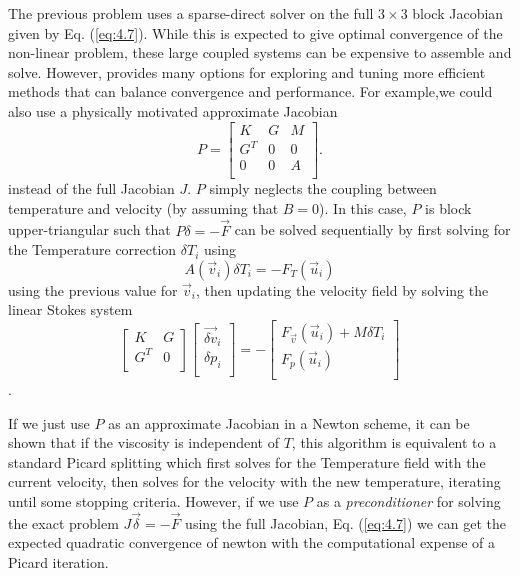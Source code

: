The previous problem uses a sparse-direct solver on the full
$3\times3$ block Jacobian given by Eq. (\ref{eq:4.7}).  While this is
expected to give optimal convergence of the non-linear problem, these
large coupled systems can be expensive to assemble and solve. However,
\TF{} provides many options for exploring and tuning more efficient
methods that can balance convergence and performance.  For example,we
could also use a physically motivated approximate Jacobian
\begin{equation}
  \label{eq:4.9}
   P = \left[
\begin{array}{ccc}
  K & G  & M \\
  G^{T} & 0 & 0 \\
  0 & 0 & A \\ 
  \end{array}
  \right].
\end{equation}
instead of the full Jacobian $J$. $P$ simply neglects the coupling between temperature and velocity
(by  assuming that $B=0$).  In this case, $P$ is block
upper-triangular such that $P\delta = -\vec{F}$  can be solved
sequentially by first solving for the Temperature correction $\delta
T_{i}$ using
\begin{equation}
  \label{eq:4.14}
  A(\vec{v}_i)\delta T_i = -F_{T}(\vec{u}_i)
\end{equation}
using the previous value for $\vec{v}_i$, then updating the velocity field by solving the linear
Stokes system
\begin{equation}
  \label{eq:4.8}
   \left[
\begin{array}{cc}
  K & G  \\
  G^{T} & 0 \\
  \end{array}
  \right]
  \left[
    \begin{array}{c}
      \vec{\delta v}_i \\
      \delta p_i \\
    \end{array}
  \right] = -\left[
    \begin{array}{c}
      F_{\vec{v}}(\vec{u}_{i}) + M\delta T_{i}\\
      F_p(\vec{u}_{i})\\
    \end{array}
  \right]
\end{equation} .


If we just use $P$ as an approximate Jacobian in a Newton scheme, it
can be shown that if the  viscosity is independent of $T$, this
algorithm is equivalent to a standard Picard splitting which first
solves for the  Temperature field with the current velocity,  then
solves for the velocity with the new temperature,  iterating until
some stopping criteria. However,  if we use $P$ as a
\emph{preconditioner} for solving the exact problem
$J\vec{\delta}=-\vec{F}$ using the full Jacobian,
Eq. (\ref{eq:4.7})  we can  get the expected quadratic
convergence of newton with the computational expense of a Picard
iteration.

